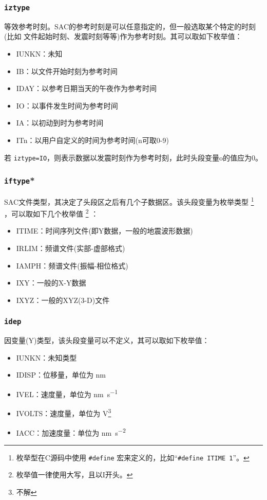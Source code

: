 \subsubsection{\texttt{iztype}}
等效参考时刻。SAC的参考时刻是可以任意指定的，但一般选取某个特定的时刻(比如
文件起始时刻、发震时刻等等)作为参考时刻。其可以取如下枚举值：
\begin{itemize}
\ttfamily
\item IUNKN：未知
\item IB：以文件开始时刻为参考时间
\item IDAY：以参考日期当天的午夜作为参考时间
\item IO：以事件发生时间为参考时间
\item IA：以初动到时为参考时间
\item ITn：以用户自定义的时间为参考时间(n可取0-9)
\end{itemize}

若 \texttt{iztype=IO}，则表示数据以发震时刻作为参考时刻，此时头段变量o的值应为0。

\subsubsection{\texttt{iftype}*}
SAC文件类型，其决定了头段区之后有几个子数据区。该头段变量为枚举类型
\footnote{枚举型在C源码中使用 \verb|#define| 宏来定义的，比如``\verb|#define ITIME 1|''。}
，可以取如下几个枚举值
\footnote{枚举值一律使用大写，且以I开头。} ：
\begin{itemize}
\ttfamily
\item ITIME：时间序列文件(即Y数据，一般的地震波形数据)
\item IRLIM：频谱文件(实部-虚部格式)
\item IAMPH：频谱文件(振幅-相位格式)
\item IXY：一般的X-Y数据
\item IXYZ：一般的XYZ(3-D)文件
\end{itemize}

\subsubsection{\texttt{idep}}
因变量(Y)类型，该头段变量可以不定义，其可以取如下枚举值：
\begin{itemize}
\ttfamily
\item IUNKN：未知类型
\item IDISP：位移量，单位为 \si{\nm}
\item IVEL：速度量，单位为 \si{\nm\per\s}
\item IVOLTS：速度量，单位为 \si{\V}\footnote{不解}
\item IACC：加速度量：单位为 \si{\nm\per\square\s}
\end{itemize}

